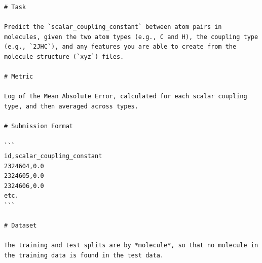 \documentclass{article} %
\begin{document}
\begin{tcolorbox}[colback=lightgray!10, colframe=black, width=\textwidth, arc=2mm, boxrule=0.5mm, title=The obfuscated description for champs-scalar-coupling, breakable]
    \begin{lstlisting}[basicstyle=\tiny\ttfamily, breaklines=true]
# Task

Predict the `scalar_coupling_constant` between atom pairs in molecules, given the two atom types (e.g., C and H), the coupling type (e.g., `2JHC`), and any features you are able to create from the molecule structure (`xyz`) files.

# Metric

Log of the Mean Absolute Error, calculated for each scalar coupling type, and then averaged across types.

# Submission Format

```
id,scalar_coupling_constant
2324604,0.0
2324605,0.0
2324606,0.0
etc.
```

# Dataset

The training and test splits are by *molecule*, so that no molecule in the training data is found in the test data.


\end{lstlisting}
\end{tcolorbox}
\end{document}
